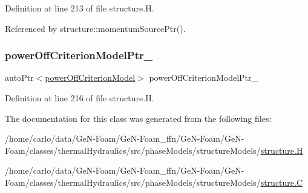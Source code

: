 Definition at line 213 of file structure.\+H.



Referenced by structure\+::momentum\+Source\+Ptr().

\mbox{\label{classFoam_1_1structure_a48dc19b9ab7e78e72916646ec5b4623c}} 
\subsubsection{\texorpdfstring{power\+Off\+Criterion\+Model\+Ptr\+\_\+}{powerOffCriterionModelPtr\_}}
{\footnotesize\ttfamily auto\+Ptr$<$\hyperlink{classFoam_1_1powerOffCriterionModel}{power\+Off\+Criterion\+Model}$>$ power\+Off\+Criterion\+Model\+Ptr\+\_\+\hspace{0.3cm}{\ttfamily [protected]}}



Definition at line 216 of file structure.\+H.



The documentation for this class was generated from the following files\+:\begin{DoxyCompactItemize}
\item 
/home/carlo/data/\+Ge\+N-\/\+Foam/\+Ge\+N-\/\+Foam\+\_\+ffn/\+Ge\+N-\/\+Foam/\+Ge\+N-\/\+Foam/classes/thermal\+Hydraulics/src/phase\+Models/structure\+Models/\hyperlink{structure_8H}{structure.\+H}\item 
/home/carlo/data/\+Ge\+N-\/\+Foam/\+Ge\+N-\/\+Foam\+\_\+ffn/\+Ge\+N-\/\+Foam/\+Ge\+N-\/\+Foam/classes/thermal\+Hydraulics/src/phase\+Models/structure\+Models/\hyperlink{structure_8C}{structure.\+C}\end{DoxyCompactItemize}
